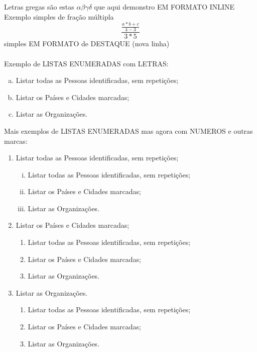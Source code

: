 \documentclass[12pt,a4paper]{report}%
\begin{document}
Letras gregas são estas $ \alpha \beta \gamma \delta $ que aqui demonstro EM FORMATO INLINE\\

Exemplo simples de fração múltipla \[ \frac{\frac{a * b + c}{4-3}}{3*5} \] simples  EM FORMATO
de DESTAQUE (nova linha)\\\\

Exemplo de LISTAS ENUMERADAS com LETRAS:
\begin{enumerate}[a)]
\item Listar todas as Pessoas identificadas, sem repetições;
\item Listar os Países e Cidades marcadas;
\item Listar as Organizações.\\ %
\end{enumerate}

Mais exemplos de LISTAS ENUMERADAS mas agora com NUMEROS e outras marcas:
\begin{enumerate}
\item Listar todas as Pessoas identificadas, sem repetições;
  \begin{enumerate}[i)]
     \item Listar todas as Pessoas identificadas, sem repetições;
     \item Listar os Países e Cidades marcadas;
     \item Listar as Organizações.\\ %
  \end{enumerate}
\item Listar os Países e Cidades marcadas;
  \begin{enumerate}[2.1)]
     \item Listar todas as Pessoas identificadas, sem repetições;
     \item Listar os Países e Cidades marcadas;
     \item Listar as Organizações.\\ %
  \end{enumerate}
\item Listar as Organizações.
    \begin{enumerate}[1)]
     \item Listar todas as Pessoas identificadas, sem repetições;
     \item Listar os Países e Cidades marcadas;
     \item Listar as Organizações.\\ %
  \end{enumerate}
\end{enumerate}
\end{document}
